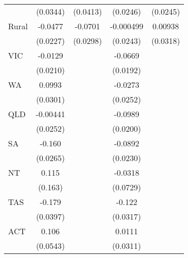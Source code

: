 {\begin{tabular}{l*{4}{c}}
                    &    (0.0344)         &    (0.0413)         &    (0.0246)         &    (0.0245)         \\
[1em]
Rural               &     -0.0477\sym{*}  &     -0.0701\sym{*}  &   -0.000499         &     0.00938         \\
                    &    (0.0227)         &    (0.0298)         &    (0.0243)         &    (0.0318)         \\
[1em]
VIC                 &     -0.0129         &                     &     -0.0669\sym{***}&                     \\
                    &    (0.0210)         &                     &    (0.0192)         &                     \\
[1em]
WA                  &      0.0993\sym{***}&                     &     -0.0273         &                     \\
                    &    (0.0301)         &                     &    (0.0252)         &                     \\
[1em]
QLD                 &    -0.00441         &                     &     -0.0989\sym{***}&                     \\
                    &    (0.0252)         &                     &    (0.0200)         &                     \\
[1em]
SA                  &      -0.160\sym{***}&                     &     -0.0892\sym{***}&                     \\
                    &    (0.0265)         &                     &    (0.0230)         &                     \\
[1em]
NT                  &       0.115         &                     &     -0.0318         &                     \\
                    &     (0.163)         &                     &    (0.0729)         &                     \\
[1em]
TAS                 &      -0.179\sym{***}&                     &      -0.122\sym{***}&                     \\
                    &    (0.0397)         &                     &    (0.0317)         &                     \\
[1em]
ACT                 &       0.106         &                     &      0.0111         &                     \\
                    &    (0.0543)         &                     &    (0.0311)         &                     \\

\end{tabular}}
